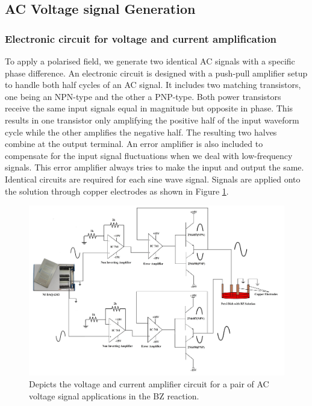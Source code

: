 \documentclass[journal=jacsat,manuscript=article]{achemso}
\begin{document}
\subsection{AC Voltage signal Generation}
\subsubsection{Electronic circuit for voltage and current amplification}
To apply a polarised field, we generate two identical AC signals with
a specific phase difference. An electronic circuit is designed with a
push-pull amplifier setup to handle both half cycles of an AC signal.
It includes two matching transistors, one being an NPN-type and the
other a PNP-type. Both power transistors receive the same input
signals equal in magnitude but opposite in phase. This results in one
transistor only amplifying the positive half of the input waveform
cycle while the other amplifies the negative half. The resulting two
halves combine at the output terminal. An error amplifier is also
included to compensate for the input signal fluctuations when we deal
with low-frequency signals. This error amplifier always tries to make
the input and output the same. Identical circuits are required for
each sine wave signal. Signals are applied onto the solution through
copper electrodes as shown in Figure \ref{fig:ex6}.
\begin{figure}[H]
    \centering
    \includegraphics[width=\linewidth]{CPEF - Copy.jpg}
    \caption{Depicts the voltage and current amplifier circuit for a
      pair of AC voltage signal applications in the BZ reaction.}
    \label{fig:ex6}
\end{figure}
\end{document}
